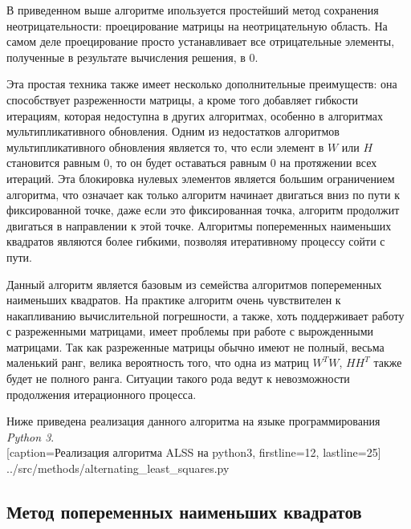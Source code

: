 В приведенном выше алгоритме ипользуется простейший метод сохранения неотрицательности:
проецирование матрицы на неотрицательную область.
На самом деле проецирование просто устанавливает все отрицательные элементы, полученные в результате
вычисления решения, в $0$.

Эта простая техника также имеет несколько дополнительные преимуществ:
она способствует разреженности матрицы, а кроме того добавляет гибкости итерациям,
которая недоступна в других алгоритмах, особенно в алгоритмах мультипликативного обновления.
Одним из недостатков алгоритмов мультипликативного обновления является то,
что если элемент в $W$ или $H$ становится равным $0$,
то он будет оставаться равным $0$ на протяжении всех итераций.
Эта блокировка нулевых элементов является большим ограничением алгоритма,
что означает как только алгоритм начинает двигаться вниз по пути к фиксированной точке,
даже если это  фиксированная точка, алгоритм продолжит двигаться в направлении к этой точке.
Алгоритмы попеременных наименьших квадратов являются более гибкими,
позволяя итеративному процессу сойти с  пути.

\newpage

Данный алгоритм является базовым из семейства алгоритмов попеременных наименьших квадратов.
На практике алгоритм очень чувствителен к накапливанию вычислительной погрешности,
а также, хоть поддерживает работу с разреженными матрицами, имеет проблемы при работе с вырожденными матрицами.
Так как разреженные матрицы обычно имеют не полный, весьма маленький ранг,
велика вероятность того, что одна из матриц $W^TW$, $HH^T$ также будет не полного ранга.
Ситуации такого рода ведут к невозможности продолжения итерационного процесса.

\newpage

Ниже приведена реализация данного алгоритма на языке программирования \textit{Python 3}.
\\


  [caption=Реализация алгоритма ALSS на python3, firstline=12, lastline=25]
  {../src/methods/alternating_least_squares.py} \label{code:als_solve}



\newpage



\subsection{Метод попеременных наименьших квадратов}

